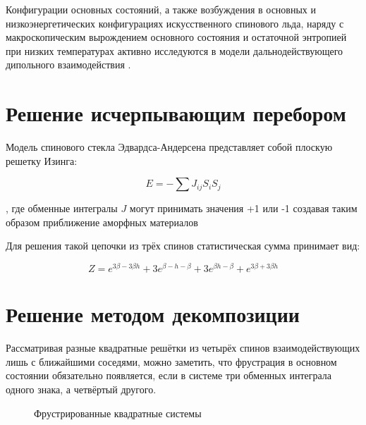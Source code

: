 \documentclass[utf8, babel, sor, jor, amsmath,amssymb, reprint]{elsarticle} %
\begin{document}
Конфигурации основных состояний, а также возбуждения в основных и низкоэнергетических конфигурациях искусственного спинового льда, наряду с макроскопическим вырождением основного состояния и остаточной энтропией  при низких температурах активно исследуются в модели дальнодействующего дипольного взаимодействия \cite{makarova2021low, singh2024micromagnetic}. 



\section{Решение исчерпывающим перебором}

Модель спинового стекла Эдвардса-Андерсена представляет собой плоскую решетку Изинга:

\begin{equation}
	E = -\sum J_{ij} S_i S_j
	\label{eq:ising_energy}
\end{equation}

, где обменные интегралы $J$ могут принимать значения +1 или -1 создавая таким образом приближение аморфных материалов

Для решения такой цепочки из трёх спинов статистическая сумма
принимает вид:

\begin{equation}
	Z = e^{3\beta - 3\beta h} + 3e^{\beta - h - \beta} + 3e^{\beta h - \beta} + e^{3\beta + 3\beta h}
	\label{eq:stat_3}
\end{equation}

\section{Решение методом декомпозиции}

Рассматривая разные квадратные решётки из четырёх спинов взаимодействующих лишь с ближайшими соседями, можно заметить, что фрустрация в основном состоянии обязательно появляется, если в системе три обменных интеграла одного знака, а четвёртый другого.

\begin{figure}[h]
	\centering
	\caption{Фрустрированные квадратные системы}
	\label{fig:label}
\end{figure}
\end{document}
